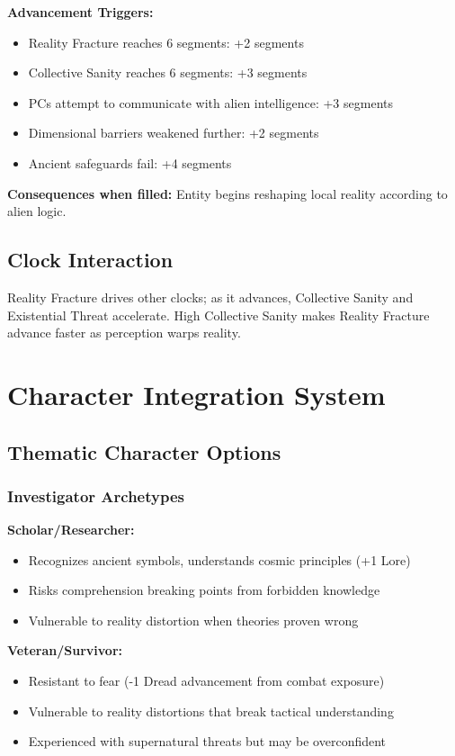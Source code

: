 \documentclass[11pt]{article}
\begin{document}
\textbf{Advancement Triggers:}
\begin{itemize}
\item Reality Fracture reaches 6 segments: +2 segments
\item Collective Sanity reaches 6 segments: +3 segments
\item PCs attempt to communicate with alien intelligence: +3 segments
\item Dimensional barriers weakened further: +2 segments
\item Ancient safeguards fail: +4 segments
\end{itemize}

\textbf{Consequences when filled:} Entity begins reshaping local reality according to alien logic.

\subsection{Clock Interaction}

Reality Fracture drives other clocks; as it advances, Collective Sanity and Existential Threat accelerate. High Collective Sanity makes Reality Fracture advance faster as perception warps reality.

\section{Character Integration System}

\subsection{Thematic Character Options}

\subsubsection{Investigator Archetypes}

\textbf{Scholar/Researcher:}
\begin{itemize}
\item Recognizes ancient symbols, understands cosmic principles (+1 Lore)
\item Risks comprehension breaking points from forbidden knowledge
\item Vulnerable to reality distortion when theories proven wrong
\end{itemize}

\textbf{Veteran/Survivor:}
\begin{itemize}
\item Resistant to fear (-1 Dread advancement from combat exposure)
\item Vulnerable to reality distortions that break tactical understanding
\item Experienced with supernatural threats but may be overconfident
\end{itemize}
\end{document}
